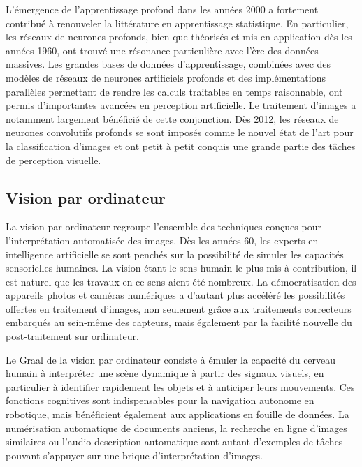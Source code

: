 L'émergence de l'apprentissage profond dans les années 2000 a fortement contribué à renouveler la littérature en apprentissage statistique. En particulier, les réseaux de neurones profonds, bien que théorisés et mis en application dès les années 1960, ont trouvé une résonance particulière avec l'ère des données massives. Les grandes bases de données d'apprentissage, combinées avec des modèles de réseaux de neurones artificiels profonds et des implémentations parallèles permettant de rendre les calculs traitables en temps raisonnable, ont permis d'importantes avancées en perception artificielle. Le traitement d'images a notamment largement bénéficié de cette conjonction. Dès 2012, les réseaux de neurones convolutifs profonds se sont imposés comme le nouvel état de l'art pour la classification d'images et ont petit à petit conquis une grande partie des tâches de perception visuelle.

\subsection{Vision par ordinateur}

La vision par ordinateur regroupe l'ensemble des techniques conçues pour l'interprétation automatisée des images. Dès les années 60, les experts en intelligence artificielle se sont penchés sur la possibilité de simuler les capacités sensorielles humaines. La vision étant le sens humain le plus mis à contribution, il est naturel que les travaux en ce sens aient été nombreux. La démocratisation des appareils photos et caméras numériques a d'autant plus accéléré les possibilités offertes en traitement d'images, non seulement grâce aux traitements correcteurs embarqués au sein-même des capteurs, mais également par la facilité nouvelle du post-traitement sur ordinateur.

Le Graal de la vision par ordinateur consiste à émuler la capacité du cerveau humain à interpréter une scène dynamique à partir des signaux visuels, en particulier à identifier rapidement les objets et à anticiper leurs mouvements. Ces fonctions cognitives sont indispensables pour la navigation autonome en robotique, mais bénéficient également aux applications en fouille de données. La numérisation automatique de documents anciens, la recherche en ligne d'images similaires ou l'audio-description automatique sont autant d'exemples de tâches pouvant s'appuyer sur une brique d'interprétation d'images.

